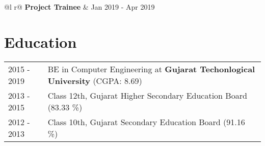 \documentclass[a4paper,10.5pt]{article}
\begin{document}
\begin{tabularx}{\linewidth}{ @{}l r@{} }
\textbf{Project Trainee} & \hfill Jan 2019 - Apr 2019 \\[3pt]
\end{tabularx}

\section{Education}
\begin{tabularx}{\linewidth}{@{}l X@{}}	
2015 - 2019 & BE in Computer Engineering at \textbf{Gujarat Techonlogical University} \hfill (CGPA: 8.69) \\
2013 - 2015 & Class 12th, Gujarat Higher Secondary Education Board \hfill (83.33 \%) \\
2012 - 2013 & Class 10th, Gujarat Secondary Education Board \hfill (91.16 \%) \\ 
\end{tabularx}
\end{document}

